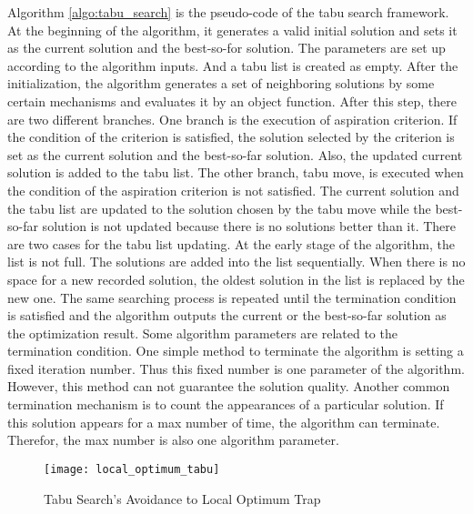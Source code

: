 		Algorithm \ref{algo:tabu_search} is the pseudo-code of the tabu search framework. 
		At the beginning of the algorithm, it generates a valid initial solution and
		sets it as the current solution and the best-so-for solution.
		The parameters are set up according to the algorithm inputs. And a tabu list is
		created as empty.
		After the initialization, the algorithm generates a set of neighboring solutions
		by some certain mechanisms and evaluates it by an object function.
		After this step, there are two different branches.
		One branch is the execution of aspiration criterion. If the condition of the
		criterion is satisfied, the solution selected by the criterion is set as the
		current solution and the best-so-far solution. Also, the updated current solution
		is added to the tabu list. 
		The other branch, tabu move, is executed when the condition of the aspiration
		criterion is not satisfied. The current solution and the tabu list are updated to
		the solution chosen by the tabu move while the best-so-far solution is not updated
		because there is no solutions better than it.
		There are two cases for the tabu list updating. At the early stage of the algorithm,
		the list is not full. The solutions are added into the list sequentially.
		When there is no space for a new recorded solution, the oldest solution in the list
		is replaced by the new one.
		The same searching process is repeated until the termination condition is satisfied
		and the algorithm outputs the current or the best-so-far solution as the optimization
		result. Some algorithm parameters are related to the termination condition.
		One simple method to terminate the algorithm is setting a fixed iteration number.
		Thus this fixed number is one parameter of the algorithm. However, this method can not
		guarantee the solution quality. Another common termination mechanism is to count the
		appearances of a particular solution. If this solution appears for a max number of time,
		the algorithm can terminate. Therefor, the max number is also one algorithm parameter.
		\begin{figure}[htb]
			\begin{center}
				\texttt{[image: local\_optimum\_tabu]}
				\caption{Tabu Search's Avoidance to Local Optimum Trap}
				\label{fig:local_optimum_tabu}
			\end{center}
		\end{figure}
	
